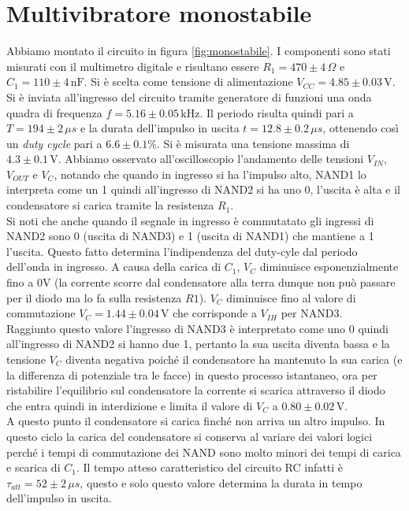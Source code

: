 \documentclass[10pt,a4paper]{article}
\begin{document}
\section{Multivibratore monostabile}
Abbiamo montato il circuito in figura \ref{fig:monostabile}. I componenti sono stati misurati con il multimetro digitale e risultano essere $R_1= 470\pm4\,\Omega$ e $C_1= 110\pm4 \,\text{nF} $. Si è scelta come tensione di alimentazione $V_{CC}= 4.85\pm0.03\,\text{V}$. Si è inviata all'ingresso del circuito tramite generatore di funzioni una onda quadra di frequenza $f = 5.16\pm0.05\,\text{kHz}$. Il periodo risulta quindi pari a $T=194\pm2\,\mu s$ e la durata dell'impulso in uscita%
$t=12.8\pm0.2\,\mu s$, ottenendo così un \emph{duty cycle} pari a $6.6\pm0.1\% $. Si è misurata una tensione massima di $4.3\pm0.1\,\text{V}$.
Abbiamo osservato all'oscilloscopio l'andamento delle tensioni $V_{IN}$, $V_{OUT}$ e $V_{C}$, notando che quando in ingresso si ha l'impulso alto, NAND1 lo interpreta come un 1 quindi all'ingresso di NAND2 si ha uno 0, l'uscita è alta e il condensatore si carica tramite la resistenza $R_1$.\\
Si noti che anche quando il segnale in ingresso è commutatato gli ingressi di NAND2 sono 0 (uscita di NAND3) e 1 (uscita di NAND1) che mantiene a 1 l'uscita. Questo fatto determina l'indipendenza del duty-cyle dal periodo dell'onda in ingresso. A causa della carica di $C_1$, $V_C$ diminuisce esponenzialmente fino a $0$V (la corrente scorre dal condensatore  alla terra dunque non può passare per il diodo ma lo fa sulla resistenza $R1$). $V_C$ diminuisce fino al valore di commutazione $V_C=1.44\pm0.04\,\text{V}$ che corrisponde a $V_{IH}$ per NAND3.\\
 Raggiunto questo valore l'ingresso di NAND3 è interpretato come uno 0 quindi all'ingresso di NAND2 si hanno due 1, pertanto la sua uscita diventa bassa e la tensione $V_C$ diventa negativa poiché  il condensatore ha mantenuto la sua carica (e la differenza di potenziale tra le facce) in questo processo istantaneo, ora per ristabilire l'equilibrio sul condensatore la corrente si scarica attraverso il diodo che entra quindi in interdizione e limita il valore di $V_C$ a $0.80\pm0.02\,\text{V}$.\\
A questo punto il condensatore si carica finché non arriva un altro impulso. In questo ciclo la carica del condensatore si conserva al variare dei valori logici perché i tempi di commutazione dei NAND sono molto minori dei tempi di carica e scarica di $C_1$. Il tempo atteso caratteristico del circuito RC  infatti è $\tau_{att}=52\pm2\,\mu s$, questo e solo questo valore determina la durata in tempo dell'impulso in uscita.\\
\end{document}
